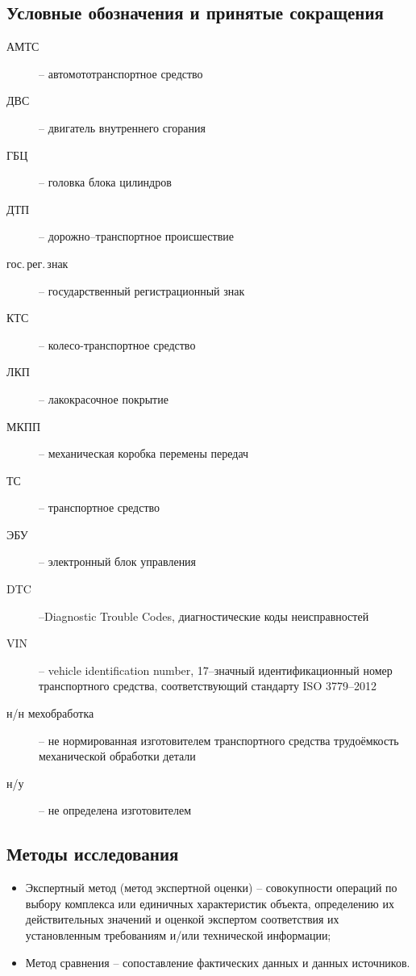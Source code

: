\subsection{Условные обозначения и принятые сокращения}
\begin{description}
%	 
\item[АМТС] -- автомототранспортное средство
\item[ДВС] -- двигатель внутреннего сгорания
\item[ГБЦ] -- головка блока цилиндров
\item[ДТП] -- дорожно--транспортное происшествие
\item[гос.\,рег.\,знак] -- государственный регистрационный знак
\item[КТС] -- колесо-транспортное средство 
\item[ЛКП] -- лакокрасочное покрытие
\item[МКПП] -- механическая коробка перемены передач
\item[ТС] -- транспортное средство
\item[ЭБУ] -- электронный блок управления
\item[DTC] --Diagnostic Trouble Codes, диагностические коды неисправностей
\item[VIN] -- vehicle identification number, 17--значный идентификационный номер транспортного средства, соответствующий стандарту ISO 3779--2012
\item[н/н мехобработка] -- не нормированная изготовителем транспортного средства трудоёмкость механической обработки детали
\item[н/у] -- не определена изготовителем  
%
\end{description}
\subsection{Методы исследования}
\begin{itemize}
\item Экспертный метод (метод экспертной оценки) -- совокупности операций по выбору комплекса или единичных характеристик объекта, определению их действительных значений и оценкой экспертом соответствия их установленным требованиям и/или технической информации;
\item Метод сравнения -- сопоставление фактических данных и данных источников.
\end{itemize}


